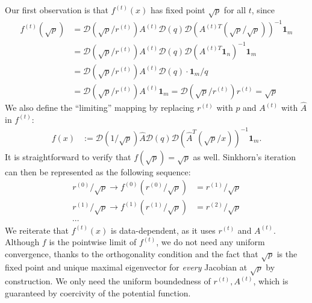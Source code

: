Our first observation is that $f^{(t)}(x)$ has fixed point $\sqrt{p}$
for all $t$, since 
\begin{align*}
f^{(t)}(\sqrt{p}) & =\mathcal{D}(\sqrt{p}/r^{(t)})A^{(t)}\mathcal{D}(q)\mathcal{D}(A^{(t)T}(\sqrt{p}/\sqrt{p}))^{-1}\mathbf{1}_{m}\\
 & =\mathcal{D}(\sqrt{p}/r^{(t)})A^{(t)}\mathcal{D}(q)\mathcal{D}(A^{(t)T}\mathbf{1}_{n})^{-1}\mathbf{1}_{m}\\
 & =\mathcal{D}(\sqrt{p}/r^{(t)})A^{(t)}\mathcal{D}(q)\cdot\mathbf{1}_{m}/q\\
 & =\mathcal{D}(\sqrt{p}/r^{(t)})A^{(t)}\mathbf{1}_{m}=\mathcal{D}(\sqrt{p}/r^{(t)})r^{(t)}=\sqrt{p}
\end{align*}
 We also define the ``limiting'' mapping by replacing $r^{(t)}$ with
$p$ and $A^{(t)}$ with $\hat{A}$ in $f^{(t)}$:
\begin{align*}
f(x) & :=\mathcal{D}(1/\sqrt{p})\hat{A}\mathcal{D}(q)\mathcal{D}(\hat{A}^{T}(\sqrt{p}/x))^{-1}\mathbf{1}_{m}.
\end{align*}
 It is straightforward to verify that $f(\sqrt{p})=\sqrt{p}$ as well.
Sinkhorn's iteration can then be represented as the following sequence:
\begin{align*}
r^{(0)}/\sqrt{p}\rightarrow f^{(0)}(r^{(0)}/\sqrt{p}) & =r^{(1)}/\sqrt{p}\\
r^{(1)}/\sqrt{p}\rightarrow f^{(1)}(r^{(1)}/\sqrt{p}) & =r^{(2)}/\sqrt{p}\\
\cdots
\end{align*}
 We reiterate that $f^{(t)}(x)$ is data-dependent, as it uses $r^{(t)}$
and $A^{(t)}$. Although $f$ is the pointwise limit of $f^{(t)}$,
we do not need any uniform convergence, thanks to the orthogonality
condition and the fact that $\sqrt{p}$ is the fixed point and unique
maximal eigenvector for \emph{every }Jacobian at $\sqrt{p}$ by construction. We only need the uniform boundedness of $r^{(t)},A^{(t)}$, which is guaranteed by coercivity of the potential function. 

